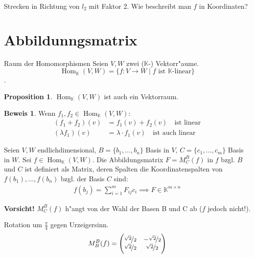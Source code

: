 \documentclass[oneside,fontsize=11pt,paper=a4,BCOR=0mm,DIV=12,automark,headsepline]{scrbook}
\DeclareMathOperator{\mHom}{Hom}
\theoremstyle{remark}
\theoremstyle{definition}
\newtheorem*{proposition}{Proposition}
\theoremstyle{definition}
\newtheorem*{prof}{Beweis}
\theoremstyle{remark}
\begin{document}
\begin{exa}
  Strecken in Richtung von \(l_2\) mit Faktor 2. Wie beschreibt man \(f\) in
  Koordinaten?
\end{exa}

\section{Abbildunngsmatrix}
\begin{definition}{Raum der Homomorphismen}{}
  Seien \(V,W\) zwei (\(\mathbb{K}\)-) Vektorr"aume.
  \[\mHom_\mathbb{K}(V,W) = \{f: V\to W \mid f \text{ ist }\mathbb{K}\text{-linear}\}\].
\end{definition}
\begin{proposition}
  \(\mHom_\mathbb{K}(V,W)\) ist auch ein Vektorraum.
\end{proposition}
\begin{prof}
  Wenn \(f_1, f_2 \in \mHom_\mathbb{K}(V,W)\):
  \begin{align*}
    (f_1 + f_2)(v) &= f_1(v) + f_2(v) \quad\text{ist linear} \\
    (\lambda f_1)(v) &= \lambda\cdot f_1(v)\quad\text{ist auch linear}
  \end{align*}
\end{prof}

Seien \(V, W\) endlichdimensional, \(B = \{b_1, \dots, b_n\}\) Basis in \(V\), \(C = \{c_1, \dots, c_m\}\) Basis in \(W\). Sei \(f \in \mHom_\mathbb{K}(V,W)\). Die Abbildungsmatrix \(F= M_C^B(f)\) in \(f\) bzgl. \(B\) und \(C\) ist definiert als
Matrix, deren Spalten die Koordinatenspalten von \(f(b_1),\dots, f(b_n)\) bzgl. der Basis \(C\) sind:
\begin{align*}
  f(b_j) = \sum_{i=1}^mF_{ij}c_i \implies F \in \mathbb{K}^{m\times n}
\end{align*}

\textbf{Vorsicht!} \(M_C^B(f)\) h"angt von der Wahl der Basen B und C ab (\(f\) jedoch nicht!).

\begin{exa}
  Rotation um \(\frac{\pi}{4}\) gegen Urzeigersinn.
  \begin{align*}
    M_B^B(f) = \begin{pmatrix}
      \nicefrac{\sqrt{2}}{2} & -\nicefrac{\sqrt{2}}{2}\\
      \nicefrac{\sqrt{2}}{2} & \nicefrac{\sqrt{2}}{2}
    \end{pmatrix}
  \end{align*}
\end{exa}
\end{document}
